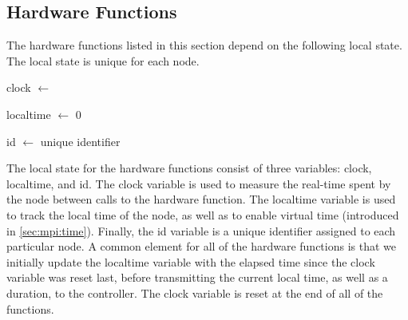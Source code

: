 

\subsection{Hardware Functions}\label{sec:hwfuncspseudo}
The hardware functions listed in this section depend on the following local state. The local state is unique for each node.\smallbreak

clock $\leftarrow$ \Now

localtime $\leftarrow$ 0

id $\leftarrow$ unique identifier 
\smallbreak





%
% 

The local state for the hardware functions consist of three variables: clock, localtime, and id. The clock variable is used to measure the real-time spent by the node between calls to the hardware function. The localtime variable is used to track the local time of the node, as well as to enable virtual time (introduced in \autoref{sec:mpi:time}). Finally, the id variable is a unique identifier assigned to each particular node. A common element for all of the hardware functions is that we initially update the localtime variable with the elapsed time since the clock variable was reset last, before transmitting the current local time, as well as a duration, to the controller. The clock variable is reset at the end of all of the functions.\medbreak

